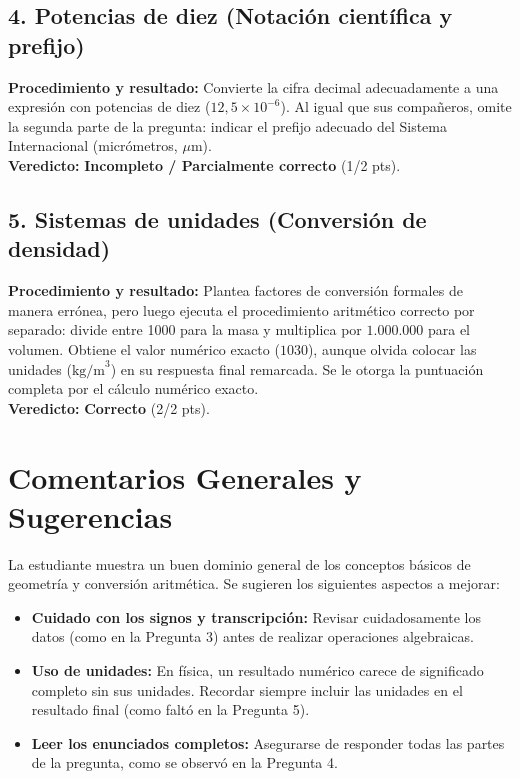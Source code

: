 \documentclass[12pt]{article}
\begin{document}
\subsection*{4. Potencias de diez (Notación científica y prefijo)}
\textbf{Procedimiento y resultado:} Convierte la cifra decimal adecuadamente a una expresión con potencias de diez ($12,5 \times 10^{-6}$). Al igual que sus compañeros, omite la segunda parte de la pregunta: indicar el prefijo adecuado del Sistema Internacional (micrómetros, $\mu$m). \\
\textbf{Veredicto:} \textbf{Incompleto / Parcialmente correcto} (1/2 pts).

\subsection*{5. Sistemas de unidades (Conversión de densidad)}
\textbf{Procedimiento y resultado:} Plantea factores de conversión formales de manera errónea, pero luego ejecuta el procedimiento aritmético correcto por separado: divide entre 1000 para la masa y multiplica por $1.000.000$ para el volumen. Obtiene el valor numérico exacto ($1030$), aunque olvida colocar las unidades ($\text{kg/m}^3$) en su respuesta final remarcada. Se le otorga la puntuación completa por el cálculo numérico exacto. \\
\textbf{Veredicto:} \textbf{Correcto} (2/2 pts).

\vspace{0.5cm}
\section*{Comentarios Generales y Sugerencias}
La estudiante muestra un buen dominio general de los conceptos básicos de geometría y conversión aritmética. Se sugieren los siguientes aspectos a mejorar:
\begin{itemize}
    \item \textbf{Cuidado con los signos y transcripción:} Revisar cuidadosamente los datos (como en la Pregunta 3) antes de realizar operaciones algebraicas.
    \item \textbf{Uso de unidades:} En física, un resultado numérico carece de significado completo sin sus unidades. Recordar siempre incluir las unidades en el resultado final (como faltó en la Pregunta 5).
    \item \textbf{Leer los enunciados completos:} Asegurarse de responder todas las partes de la pregunta, como se observó en la Pregunta 4.
\end{itemize}
\end{document}

